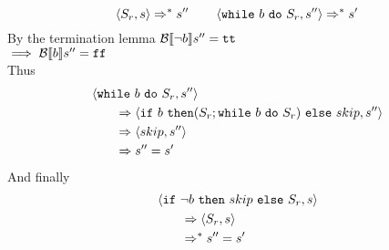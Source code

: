 \begin{exercise}
\begin{itemize}
\begin{itemize}
                \[ \left<S_r, s\right> \Rightarrow^* s'' \qquad \left<\texttt{while}\ b\ \texttt{do}\ S_r, s''\right> \Rightarrow^* s' \]
                By the termination lemma $\mathcal{B} \llbracket  \neg b \rrbracket s'' = \texttt{tt}$ \\
                $\implies \mathcal{B} \llbracket  b \rrbracket s'' = \texttt{ff}$ \\
                Thus
                \begin{align*}
                    &\instr{\texttt{while}\ b\ \texttt{do}\ S_r}{s''}
                    \\&\qquad\Rightarrow \instr{\texttt{if}\ b\ \texttt{then} (S_r; \texttt{while}\ b\ \texttt{do}\ S_r)\ \texttt{else}\ skip}{s''}
                    \\&\qquad\Rightarrow \instr{skip}{s''}
                    \\&\qquad\Rightarrow s'' = s'
                \end{align*}
                And finally
                \begin{align*}
                    &\instr{\texttt{if}\ \neg b\ \texttt{then}\ skip\ \texttt{else}\ S_r}{s}
                    \\&\qquad\Rightarrow \instr{S_r}{s}
                    \\&\qquad\Rightarrow^* s'' = s'
                \end{align*}
            \end{itemize}
    \end{itemize}
\end{exercise}
